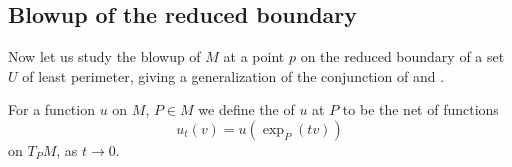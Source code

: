 
\subsection{Blowup of the reduced boundary}
Now let us study the blowup of $M$ at a point $p$ on the reduced boundary of a set $U$ of least perimeter, giving a generalization of the conjunction of \cite[Theorem 9.3]{Giusti77} and \cite[Theorem 6.2.2]{Simons68}.

\begin{definition}
For a function $u$ on $M$, $P \in M$ we define the  of $u$ at $P$ to be the net of functions
$$u_t(v) = u\left(\exp_P(tv)\right)$$
on $T_PM$, as $t \to 0$.
\end{definition}

